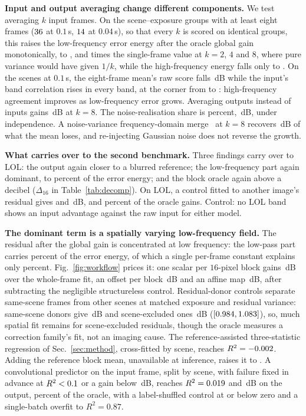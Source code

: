 \noindent\textbf{Input and output averaging change different components.} We test
averaging $k$ input frames. On
the \nMFn{} scene--exposure groups with at least eight frames ($36{}$ at $0.1$\,s, $14{}$ at $0.04$\,s), so that every $k$ is scored on identical
groups, this raises the low-frequency error energy after the oracle global gain
monotonically, to \nMFlfb{}, \nMFlfd{} and \nMFlfh{} times the single-frame value at
$k=2$, $4$ and $8$, where pure variance would have given $1/k$, while the high-frequency
energy falls only to \nMFhfh{}. On the \nMFlongN{} scenes at $0.1$\,s, the eight-frame mean's raw score falls \nMFdropRe{}\,dB while the input's band correlation rises in every band, at the corner from \nMFinFixA{} to \nMFinFixB{}: high-frequency agreement improves as low-frequency error grows. Averaging outputs instead of inputs gains \nMFoutGain{}\,dB at $k=8$. The noise-realisation share is \nNOISEshare{} percent, \nNOISEdb{}\,dB, under independence. A noise-variance frequency-domain merge~\cite{hdrplus2016} at $k=8$ recovers \nHPdFB{}\,dB of what the mean loses, and re-injecting Gaussian noise does not reverse the growth.


\noindent\textbf{What carries over to the second benchmark.} Three findings carry over to LOL: the output again closer to a blurred reference; the low-frequency part again dominant, \nLOLlfLo{} to \nLOLlfHi{} percent of
the error energy; and the block oracle again above a decibel ($\Delta_{16}$ in Table~\ref{tab:decomp}). On LOL, a control fitted to another image's residual gives \nLPcidPerm{}
and \nLPretPerm{}\,dB, \nLPcidPct{} and \nLPretPct{} percent of the oracle gains.
Control: no LOL band shows an input advantage against the raw input for either model.

\noindent\textbf{The dominant term is a spatially varying low-frequency field.} The residual after the
global gain is concentrated at low frequency: the low-pass part carries \nLFshare{}
percent of the error energy, of which a single per-frame constant explains only
\nLFconst{} percent. Fig.~\ref{fig:workflow} prices it: one scalar per $16$-pixel block gains \nLADgain{}\,dB over the whole-frame fit, an offset per block \nLADoff{}\,dB and an affine map \nLADaff{}\,dB, after subtracting the negligible structureless control. Residual-donor controls separate same-scene frames from other scenes at matched exposure and residual variance: same-scene donors give \nDonorSame{}\,dB and scene-excluded ones \nDonorCross{}\,dB ($[0.984{},1.083{}]$), so, much spatial fit remains for scene-excluded residuals, though the oracle measures a correction family's fit, not an imaging cause. The reference-assisted three-statistic regression of
Sec.~\ref{sec:method}, cross-fitted by scene, reaches $R^{2}=-0.002{}$.
Adding the reference block mean, unavailable at inference, raises it to
\nRTWOall{}.
A convolutional predictor on the input frame, split by scene, with failure fixed in advance at $R^{2}<0.1{}$ or a gain below \nTHRdb{}\,dB, reaches $R^{2}=0.019{}$ and \nCNNdb{}\,dB on the output, \nCNNfrac{} percent of the oracle, with a label-shuffled control at or below zero and a single-batch overfit to $R^{2}=0.87$. 

